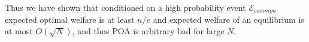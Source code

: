 \begin{example}
Thus we have shown that conditioned on a high probability event $\mathcal{E}_{common}$ expected optimal welfare is at least $n/e$ and expected welfare of an equilibrium is at most $O(\sqrt{N})$, and thus POA is arbitrary bad for large $N$.

\end{example}